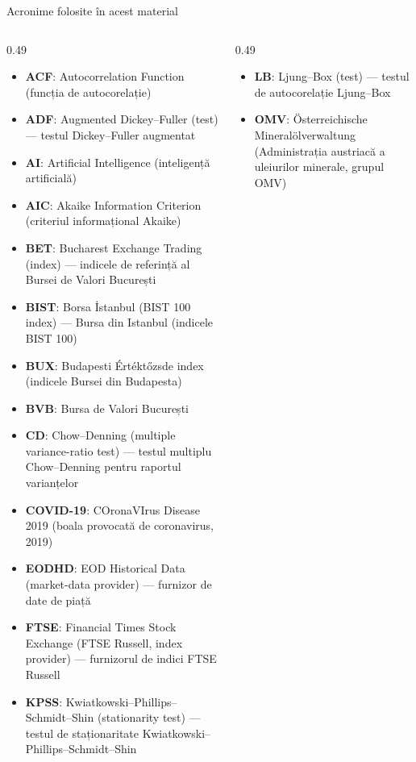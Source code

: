 \begin{frame}{Acronime folosite în acest material}
\begin{columns}[T]
\begin{column}{0.49\textwidth}
\begin{itemize}\setlength{\itemsep}{0pt}
    \item \textbf{ACF}: Autocorrelation Function (funcția de autocorelație)
    \item \textbf{ADF}: Augmented Dickey–Fuller (test) — testul Dickey–Fuller augmentat
    \item \textbf{AI}: Artificial Intelligence (inteligență artificială)
    \item \textbf{AIC}: Akaike Information Criterion (criteriul informațional Akaike)
    \item \textbf{BET}: Bucharest Exchange Trading (index) — indicele de referință al Bursei de Valori București
    \item \textbf{BIST}: Borsa İstanbul (BIST 100 index) — Bursa din Istanbul (indicele BIST 100)
    \item \textbf{BUX}: Budapesti Értéktőzsde index (indicele Bursei din Budapesta)
    \item \textbf{BVB}: Bursa de Valori București
    \item \textbf{CD}: Chow–Denning (multiple variance-ratio test) — testul multiplu Chow–Denning pentru raportul varianțelor
    \item \textbf{COVID-19}: COronaVIrus Disease 2019 (boala provocată de coronavirus, 2019)
    \item \textbf{EODHD}: EOD Historical Data (market-data provider) — furnizor de date de piață
    \item \textbf{FTSE}: Financial Times Stock Exchange (FTSE Russell, index provider) — furnizorul de indici FTSE Russell
    \item \textbf{KPSS}: Kwiatkowski–Phillips–Schmidt–Shin (stationarity test) — testul de staționaritate Kwiatkowski–Phillips–Schmidt–Shin
\end{itemize}
\end{column}
\begin{column}{0.49\textwidth}
\begin{itemize}\setlength{\itemsep}{0pt}
    \item \textbf{LB}: Ljung–Box (test) — testul de autocorelație Ljung–Box
    \item \textbf{OMV}: Österreichische Mineralölverwaltung (Administrația austriacă a uleiurilor minerale, grupul OMV)

\end{itemize}
\end{column}
\end{columns}
\end{frame}
